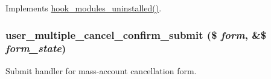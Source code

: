 \label{user_8module_a2eeb0c76aaabb3e178ab069c4f88fc1f}
Implements \hyperlink{group__hooks_ga4f29c7343438068a922459cbe0810279}{hook\_\-modules\_\-uninstalled()}. \hypertarget{user_8module_a7c21efb11cd202cddd82b3dc87fdd0a7}{
\subsubsection[{user\_\-multiple\_\-cancel\_\-confirm\_\-submit}]{\setlength{\rightskip}{0pt plus 5cm}user\_\-multiple\_\-cancel\_\-confirm\_\-submit (\$ {\em form}, \/  \&\$ {\em form\_\-state})}}
\label{user_8module_a7c21efb11cd202cddd82b3dc87fdd0a7}
Submit handler for mass-\/account cancellation form.

